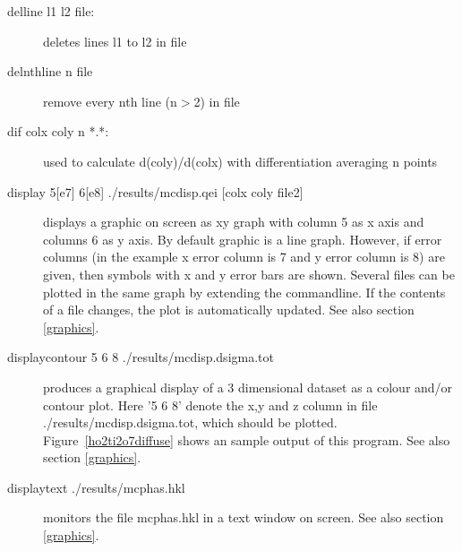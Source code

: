 \begin{description}
\item [\prg delline\label{delline} l1 l2 file:] deletes lines l1 to l2  in file
\item [\prg delnthline\label{delnthline} n file]  remove every nth line (n$>$2) in file
\item [\prg dif\label{dif} colx coly n *.*:] used to calculate d(coly)/d(colx) with %
differentiation averaging n points
\item [\prg display 5{[e7]} 6{[e8]}  ./results/mcdisp.qei {[colx coly file2]}] displays a graphic on screen as xy %
graph
with column 5 as x axis and columns 6 as y axis. By default graphic is a line graph.
However, if error columns (in the example x error column is 7 and y error column is 8)
are given, then symbols with x and y error bars are shown. Several files
can be plotted in the same graph by extending the commandline. If the contents of a file
changes, the plot is automatically updated. See also section \ref{graphics}.
\item [\prg displaycontour 5 6 8 ./results/mcdisp.dsigma.tot] produces a %
graphical
display of a 3 dimensional dataset as a colour and/or contour plot. Here '5 6 8' 
denote the x,y and z column in file {\prg ./results/mcdisp.dsigma.tot}, which should
be plotted. Figure~\ref{ho2ti2o7diffuse} shows an sample output of this program. See also section \ref{graphics}.
\item [\prg displaytext\label{displaytext} ./results/mcphas.hkl] monitors the file mcphas.hkl in %
a text window on screen. See also section \ref{graphics}.

\end{description}
